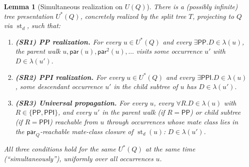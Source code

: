 \documentclass[11pt]{article}
\newtheorem{lemma}[theorem]{Lemma}
\theoremstyle{definition}
\theoremstyle{remark}
\newcommand{\PP}{\mathsf{PP}}
\newcommand{\PPI}{\mathsf{PPI}}
\newcommand{\st}{\operatorname{st}}
\begin{document}
\begin{lemma}[Simultaneous realization on $U(Q)$]\label{lem:simul-realization}
There is a (possibly infinite) tree presentation $U^\ast(Q)$,
concretely realized by the split tree $T$, projecting to $Q$ via
$\st_d$, such that:
\begin{enumerate}[label=(SR\arabic*),leftmargin=2em]
\item \textbf{(SR1) PP realization.}\; For every $u \in U^\ast(Q)$ and
  every $\exists\PP.D \in \lambda(u)$, the parent walk
  $u, \mathsf{par}(u), \mathsf{par}^2(u), \ldots$ visits some
  occurrence $u'$ with $D \in \lambda(u')$.
\item \textbf{(SR2) PPI realization.}\; For every $u \in U^\ast(Q)$ and
  every $\exists\PPI.D \in \lambda(u)$, some descendant occurrence
  $u'$ in the child subtree of $u$ has $D \in \lambda(u')$.
\item \textbf{(SR3) Universal propagation.}\; For every $u$, every
  $\forall R.D \in \lambda(u)$ with $R\in\{\PP,\PPI\}$, and every
  $u'$ in the parent walk (if $R=\PP$) or child subtree (if $R=\PPI$)
  reachable from $u$ through occurrences whose mate class lies in the
  $\mathsf{par}_Q$-reachable mate-class closure of $\st_d(u)$:
  $D \in \lambda(u')$.
\end{enumerate}
All three conditions hold for the same $U^\ast(Q)$ at the same time
(``simultaneously''), uniformly over all occurrences $u$.
\end{lemma}
\end{document}
